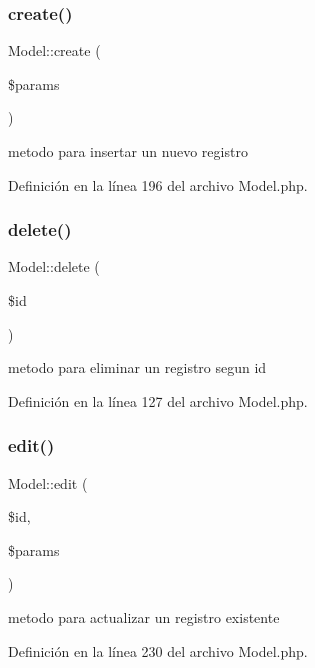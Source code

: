 \subsubsection{\texorpdfstring{create()}{create()}}
{\footnotesize\ttfamily Model\+::create (\begin{DoxyParamCaption}\item[{}]{\$params }\end{DoxyParamCaption})}

metodo para insertar un nuevo registro 

Definición en la línea 196 del archivo Model.\+php.

\mbox{\label{class_model_ae045fb57af57685c24f2dbe5fbd7f684}} 
\subsubsection{\texorpdfstring{delete()}{delete()}}
{\footnotesize\ttfamily Model\+::delete (\begin{DoxyParamCaption}\item[{}]{\$id }\end{DoxyParamCaption})}

metodo para eliminar un registro segun id 

Definición en la línea 127 del archivo Model.\+php.

\mbox{\label{class_model_adae5eb27d36ae799ef4fa23dec88d302}} 
\subsubsection{\texorpdfstring{edit()}{edit()}}
{\footnotesize\ttfamily Model\+::edit (\begin{DoxyParamCaption}\item[{}]{\$id,  }\item[{}]{\$params }\end{DoxyParamCaption})}

metodo para actualizar un registro existente 

Definición en la línea 230 del archivo Model.\+php.

\mbox{\label{class_model_afbf5f640ebb15823608a233cc3f2e8f5}} 
